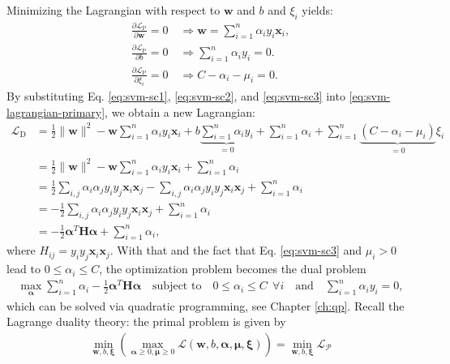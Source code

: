 \documentclass[11pt, a4paper, parskip=half*, bibliography=totoc, cleardoublepage=empty, final,
numbers=noenddot]{scrbook}
\begin{document}
Minimizing the Lagrangian with respect to $\bm{w}$ and $b$ and $\xi_i$ yields:
\begin{align}
\frac{\partial \mathcal{L}_\text{P}}{\partial \bm{w}} = 0 \quad  \Rightarrow \bm{w} = \sum_{i=1}^n \alpha_i y_i \bm{x}_i, \label{eq:svm-sc1}\\
\frac{\partial \mathcal{L}_\text{P}}{\partial b} = 0 \quad  \Rightarrow \sum_{i=1}^n \alpha_i y_i  = 0. \label{eq:svm-sc2}\\
\frac{\partial \mathcal{L}_\text{P}}{\partial \xi_i} = 0 \quad  \Rightarrow C - \alpha_i - \mu_i =0. \label{eq:svm-sc3}
\end{align}
By substituting Eq. \ref{eq:svm-sc1}, \ref{eq:svm-sc2}, and \ref{eq:svm-sc3} into \ref{eq:svm-lagrangian-primary}, we obtain a new Lagrangian:
\begin{align}
\mathcal{L}_\text{D} &= \frac{1}{2} \| \bm{w} \|^2 - \bm{w} \sum_{i=1}^n \alpha_i y_i \bm{x}_i  + b \underbrace{\sum_{i=1}^n \alpha_i y_i}_{=0}+ \sum_{i=1}^n \alpha_i + \sum_{i=1}^n \underbrace{(C - \alpha_i - \mu_i)}_{=0} \xi_i\\
&= \frac{1}{2} \| \bm{w} \|^2 - \bm{w} \sum_{i=1}^n \alpha_i y_i \bm{x}_i +\sum_{i=1}^n \alpha_i \\
&= \frac{1}{2} \sum_{i,j} \alpha_i \alpha_j y_i y_j \bm{x}_i \bm{x}_j- \sum_{i,j} \alpha_i \alpha_j y_i y_j \bm{x}_i \bm{x}_j  + \sum_{i=1}^n \alpha_i\\ 
&= -\frac{1}{2} \sum_{i,j} \alpha_i \alpha_j y_i y_j \bm{x}_i \bm{x}_j  + \sum_{i=1}^n \alpha_i\\
&= -\frac{1}{2} \bm{\alpha}^T \bm{H} \bm{\alpha}  + \sum_{i=1}^n \alpha_i,
\label{eq:svm-lagrangian-dual}
\end{align}
where $H_{ij} = y_i y_j \bm{x}_i \bm{x}_j $. With that and the fact that Eq. \ref{eq:svm-sc3} and $\mu_i > 0$ lead to $ 0 \leq \alpha_i \leq C$, the optimization problem becomes the dual problem
\begin{align}
\max_{\bm{\alpha}} \sum_{i=1}^n \alpha_i -\frac{1}{2} \bm{\alpha}^T \bm{H} \bm{\alpha}  \quad \text{subject to} \quad   0 \leq \alpha_i \leq C \ \ \forall i \quad \text{and} \quad \sum_{i=1}^n \alpha_i y_i  = 0,
\end{align} 
which can be solved via quadratic programming, see Chapter \ref{ch:qp}. Recall the Lagrange duality theory: the primal problem is given by
\begin{align}
\min_{\bm{w}, b, \bm{\xi}}\left( \max_{\bm{\alpha}\geq0, \bm{\mu}\geq0} \mathcal{L}(\bm{w}, b, \bm{\alpha}, \bm{\mu}, \bm{\xi}) \right) = \min_{\bm{w}, b, \bm{\xi}} \mathcal{L_\text{P}}
\end{align}
\end{document}
